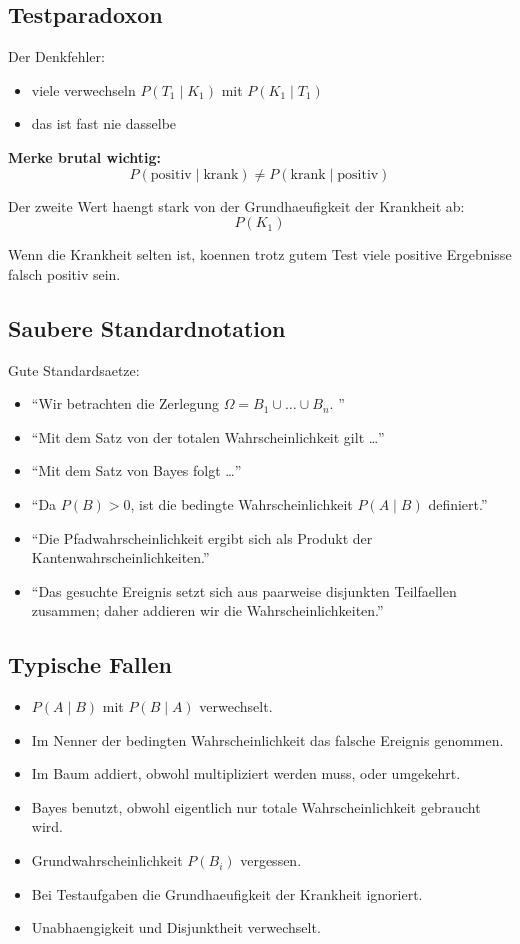 \documentclass[a4paper,11pt]{article}
\begin{document}
\subsection{Testparadoxon}
Der Denkfehler:
\begin{itemize}
  \item viele verwechseln $P(T_1\mid K_1)$ mit $P(K_1\mid T_1)$
  \item das ist fast nie dasselbe
\end{itemize}

\textbf{Merke brutal wichtig:}
\[
P(\text{positiv}\mid \text{krank}) \neq P(\text{krank}\mid \text{positiv})
\]

Der zweite Wert haengt stark von der Grundhaeufigkeit der Krankheit ab:
\[
P(K_1)
\]

Wenn die Krankheit selten ist, koennen trotz gutem Test viele positive Ergebnisse falsch positiv sein.

\subsection{Saubere Standardnotation}
Gute Standardsaetze:
\begin{itemize}
  \item ``Wir betrachten die Zerlegung $\Omega=B_1\cup\dots\cup B_n$. ''
  \item ``Mit dem Satz von der totalen Wahrscheinlichkeit gilt \dots''
  \item ``Mit dem Satz von Bayes folgt \dots''
  \item ``Da $P(B)>0$, ist die bedingte Wahrscheinlichkeit $P(A\mid B)$ definiert.''
  \item ``Die Pfadwahrscheinlichkeit ergibt sich als Produkt der Kantenwahrscheinlichkeiten.''
  \item ``Das gesuchte Ereignis setzt sich aus paarweise disjunkten Teilfaellen zusammen; daher addieren wir die Wahrscheinlichkeiten.''
\end{itemize}

\subsection{Typische Fallen}
\begin{itemize}
  \item $P(A\mid B)$ mit $P(B\mid A)$ verwechselt.
  \item Im Nenner der bedingten Wahrscheinlichkeit das falsche Ereignis genommen.
  \item Im Baum addiert, obwohl multipliziert werden muss, oder umgekehrt.
  \item Bayes benutzt, obwohl eigentlich nur totale Wahrscheinlichkeit gebraucht wird.
  \item Grundwahrscheinlichkeit $P(B_i)$ vergessen.
  \item Bei Testaufgaben die Grundhaeufigkeit der Krankheit ignoriert.
  \item Unabhaengigkeit und Disjunktheit verwechselt.
\end{itemize}
\end{document}
